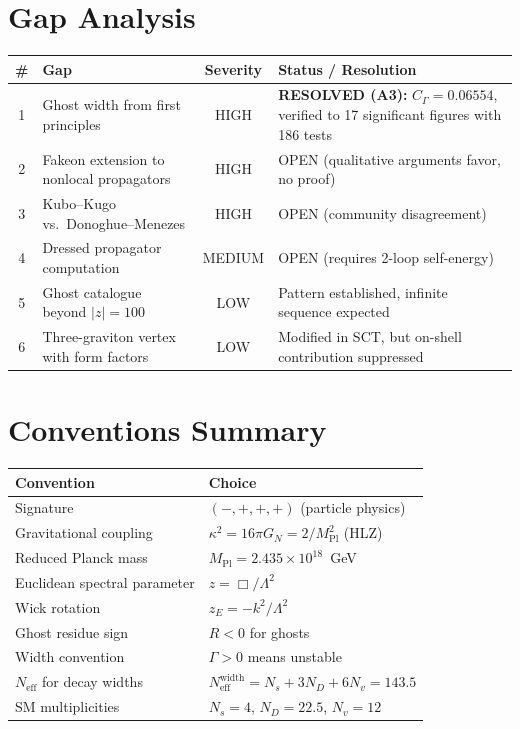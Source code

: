\documentclass[11pt,a4paper]{article}
\theoremstyle{plain}
\theoremstyle{definition}
\theoremstyle{remark}
\newcommand{\MPl}{M_{\mathrm{Pl}}}
\newcommand{\Neff}{N_{\mathrm{eff}}}
\begin{document}
\section{Gap Analysis}
\label{sec:gaps}

\begin{center}
\begin{tabular}{clcp{6cm}}
\toprule
\# & Gap & Severity & Status / Resolution \\
\midrule
1 & Ghost width from first principles & HIGH &
  \textbf{RESOLVED (A3):} $C_\Gamma = 0.06554$, verified to 17
  significant figures with 186 tests \\
2 & Fakeon extension to nonlocal propagators & HIGH &
  OPEN (qualitative arguments favor, no proof) \\
3 & Kubo--Kugo vs.\ Donoghue--Menezes & HIGH &
  OPEN (community disagreement) \\
4 & Dressed propagator computation & MEDIUM &
  OPEN (requires 2-loop self-energy) \\
5 & Ghost catalogue beyond $|z| = 100$ & LOW &
  Pattern established, infinite sequence expected \\
6 & Three-graviton vertex with form factors & LOW &
  Modified in SCT, but on-shell contribution suppressed \\
\bottomrule
\end{tabular}
\end{center}


\section{Conventions Summary}
\label{sec:conv-summary}

\begin{center}
\begin{tabular}{ll}
\toprule
Convention & Choice \\
\midrule
Signature & $(-,+,+,+)$ (particle physics) \\
Gravitational coupling & $\kappa^2 = 16\pi G_N = 2/\MPl^2$ (HLZ) \\
Reduced Planck mass & $\MPl = 2.435 \times 10^{18}$~GeV \\
Euclidean spectral parameter & $z = \Box/\Lambda^2$ \\
Wick rotation & $z_E = -k^2/\Lambda^2$ \\
Ghost residue sign & $R < 0$ for ghosts \\
Width convention & $\Gamma > 0$ means unstable \\
$\Neff$ for decay widths & $\Neff^{\mathrm{width}} = N_s + 3N_D + 6N_v
  = 143.5$ \\
SM multiplicities & $N_s = 4$, $N_D = 22.5$, $N_v = 12$ \\
\bottomrule
\end{tabular}
\end{center}
\end{document}
